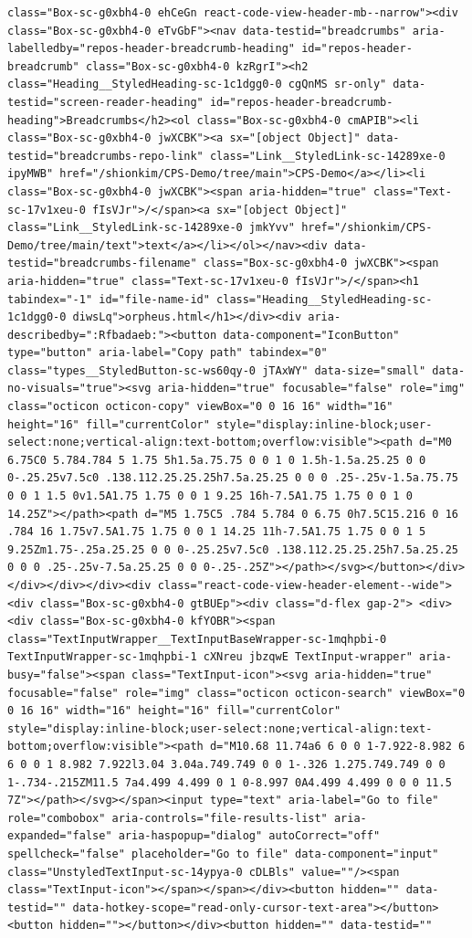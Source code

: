 \documentclass[
  letterpaper,
]{book}
\begin{document}
\begin{verbatim}
class="Box-sc-g0xbh4-0 ehCeGn react-code-view-header-mb--narrow"><div class="Box-sc-g0xbh4-0 eTvGbF"><nav data-testid="breadcrumbs" aria-labelledby="repos-header-breadcrumb-heading" id="repos-header-breadcrumb" class="Box-sc-g0xbh4-0 kzRgrI"><h2 class="Heading__StyledHeading-sc-1c1dgg0-0 cgQnMS sr-only" data-testid="screen-reader-heading" id="repos-header-breadcrumb-heading">Breadcrumbs</h2><ol class="Box-sc-g0xbh4-0 cmAPIB"><li class="Box-sc-g0xbh4-0 jwXCBK"><a sx="[object Object]" data-testid="breadcrumbs-repo-link" class="Link__StyledLink-sc-14289xe-0 ipyMWB" href="/shionkim/CPS-Demo/tree/main">CPS-Demo</a></li><li class="Box-sc-g0xbh4-0 jwXCBK"><span aria-hidden="true" class="Text-sc-17v1xeu-0 fIsVJr">/</span><a sx="[object Object]" class="Link__StyledLink-sc-14289xe-0 jmkYvv" href="/shionkim/CPS-Demo/tree/main/text">text</a></li></ol></nav><div data-testid="breadcrumbs-filename" class="Box-sc-g0xbh4-0 jwXCBK"><span aria-hidden="true" class="Text-sc-17v1xeu-0 fIsVJr">/</span><h1 tabindex="-1" id="file-name-id" class="Heading__StyledHeading-sc-1c1dgg0-0 diwsLq">orpheus.html</h1></div><div aria-describedby=":Rfbadaeb:"><button data-component="IconButton" type="button" aria-label="Copy path" tabindex="0" class="types__StyledButton-sc-ws60qy-0 jTAxWY" data-size="small" data-no-visuals="true"><svg aria-hidden="true" focusable="false" role="img" class="octicon octicon-copy" viewBox="0 0 16 16" width="16" height="16" fill="currentColor" style="display:inline-block;user-select:none;vertical-align:text-bottom;overflow:visible"><path d="M0 6.75C0 5.784.784 5 1.75 5h1.5a.75.75 0 0 1 0 1.5h-1.5a.25.25 0 0 0-.25.25v7.5c0 .138.112.25.25.25h7.5a.25.25 0 0 0 .25-.25v-1.5a.75.75 0 0 1 1.5 0v1.5A1.75 1.75 0 0 1 9.25 16h-7.5A1.75 1.75 0 0 1 0 14.25Z"></path><path d="M5 1.75C5 .784 5.784 0 6.75 0h7.5C15.216 0 16 .784 16 1.75v7.5A1.75 1.75 0 0 1 14.25 11h-7.5A1.75 1.75 0 0 1 5 9.25Zm1.75-.25a.25.25 0 0 0-.25.25v7.5c0 .138.112.25.25.25h7.5a.25.25 0 0 0 .25-.25v-7.5a.25.25 0 0 0-.25-.25Z"></path></svg></button></div></div></div></div><div class="react-code-view-header-element--wide"><div class="Box-sc-g0xbh4-0 gtBUEp"><div class="d-flex gap-2"> <div><div class="Box-sc-g0xbh4-0 kfYOBR"><span class="TextInputWrapper__TextInputBaseWrapper-sc-1mqhpbi-0 TextInputWrapper-sc-1mqhpbi-1 cXNreu jbzqwE TextInput-wrapper" aria-busy="false"><span class="TextInput-icon"><svg aria-hidden="true" focusable="false" role="img" class="octicon octicon-search" viewBox="0 0 16 16" width="16" height="16" fill="currentColor" style="display:inline-block;user-select:none;vertical-align:text-bottom;overflow:visible"><path d="M10.68 11.74a6 6 0 0 1-7.922-8.982 6 6 0 0 1 8.982 7.922l3.04 3.04a.749.749 0 0 1-.326 1.275.749.749 0 0 1-.734-.215ZM11.5 7a4.499 4.499 0 1 0-8.997 0A4.499 4.499 0 0 0 11.5 7Z"></path></svg></span><input type="text" aria-label="Go to file" role="combobox" aria-controls="file-results-list" aria-expanded="false" aria-haspopup="dialog" autoCorrect="off" spellcheck="false" placeholder="Go to file" data-component="input" class="UnstyledTextInput-sc-14ypya-0 cDLBls" value=""/><span class="TextInput-icon"></span></span></div><button hidden="" data-testid="" data-hotkey-scope="read-only-cursor-text-area"></button><button hidden=""></button></div><button hidden="" data-testid="" 
\end{verbatim}
\end{document}
